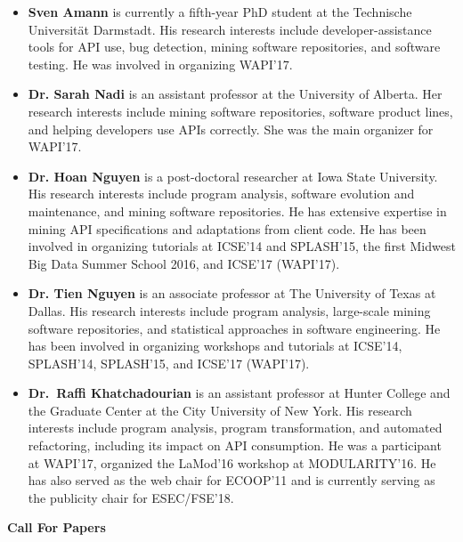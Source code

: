 \documentclass[10pt, conference]{IEEEtran}
\begin{document}
\begin{itemize}
\setlength\itemsep{5pt}
\item \textbf{Sven Amann} is currently a fifth-year PhD student at the Technische Universit\"{a}t Darmstadt. His research interests include developer-assistance tools for API use, bug detection, mining software repositories, and software testing. He was involved in organizing WAPI'17.

\item \textbf{Dr. Sarah Nadi} is an assistant professor at the University of Alberta. Her research interests include mining software repositories, software product lines, and helping developers use APIs correctly. She was the main organizer for WAPI'17.

\item \textbf{Dr. Hoan Nguyen} is a post-doctoral researcher at Iowa State University. His research interests include program analysis, software evolution and maintenance, and mining software repositories. He has extensive expertise in mining API specifications and adaptations from client code. He has been involved in organizing tutorials at ICSE'14 and SPLASH'15, the first Midwest Big Data Summer School 2016, and ICSE'17 (WAPI'17).

\item \textbf{Dr. Tien Nguyen} is an associate professor at The University of Texas at Dallas. His research interests include program analysis, large-scale mining software repositories, and statistical approaches in software engineering. He has been involved in organizing workshops and tutorials at ICSE’14, SPLASH’14, SPLASH’15, and ICSE'17 (WAPI'17).

\item \textbf{Dr.~Raffi Khatchadourian} is an assistant professor at Hunter College and the Graduate Center at the City University of New York. His research interests include program analysis, program transformation, and automated refactoring, including its impact on API consumption. He was a participant at WAPI'17, organized the LaMod'16 workshop at MODULARITY'16. He has also served as the web chair for ECOOP'11 and is currently serving as the publicity chair for ESEC/FSE'18.
\end{itemize}




\newpage
\onecolumn

\begin{center}
\Large{\textbf{Call For Papers}}
\end{center}
\end{document}
